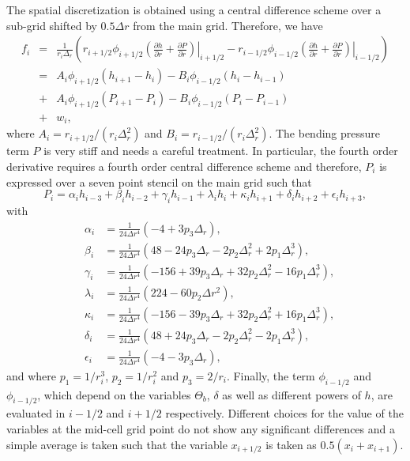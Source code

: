 The  spatial discretization  is  obtained using  a central  difference
scheme  over  a  sub-grid  shifted  by $0.5\Delta  r$  from  the  main
grid. Therefore, we have
\begin{eqnarray}
  f_i&=&\frac{1}{r_i \Delta_r}\left(r_{i+1/2}\phi_{i+1/2}\left.\left(\frac{\partial h}{\partial r}+\frac{\partial P}{\partial r}\right)\right|_{i+1/2}-r_{i-1/2}\phi_{i-1/2}\left.\left(\frac{\partial h}{\partial r}+\frac{\partial P}{\partial r}\right)\right|_{i-1/2}\right)\nonumber\\
     &=&A_i\phi_{i+1/2}\left(h_{i+1}-h_i\right)-B_i\phi_{i-1/2}\left(h_{i}-h_{i-1}\right)\nonumber\\
     &+&A_i\phi_{i+1/2}\left(P_{i+1}-P_i\right)-B_i\phi_{i-1/2}\left(P_{i}-P_{i-1}\right)\nonumber\\
     &+&w_i,\label{C4-Num-3}
\end{eqnarray}
where                $A_i=r_{i+1/2}/(r_i\Delta_r^2)$               and
$B_i=r_{i-1/2}/(r_i\Delta_r^2)$.   The bending  pressure  term $P$  is
very stiff and  needs a careful treatment.  In  particular, the fourth
order derivative requires a fourth order central difference scheme and
therefore, $P_i$ is  expressed over a seven point stencil  on the main
grid such that
\begin{equation}
  P_{i}=   \alpha_{i}h_{i-3}  +   \beta_{i}h_{i-2}+\gamma_{i}  h_{i-1}
  +\lambda_{i}h_{i}+\kappa_{i}h_{i+1}+\delta_ih_{i+2}+\epsilon_ih_{i+3},
  \label{C4-Num-4}
\end{equation}
with
\begin{eqnarray}
  &\alpha_{i}&=\frac{1}{24\Delta r^{4}}\left(-4+3p_3\Delta_r \right)\nonumber ,\\
  &\beta_{i}&=\frac{1}{24\Delta r^{4}}\left(48-24p_3\Delta_r-2p_2\Delta_r^2+2p_1\Delta_r^3\right) \nonumber,\\
  &\gamma_{i}&=\frac{1}{24\Delta r^{4}}\left(-156+39p_3\Delta_r+32p_2\Delta_r^2-16p_1\Delta_r^3\right)\nonumber,\\
  &\lambda_{i}&=\frac{1}{24\Delta r^{4}}\left(224-60p_2\Delta r^{2}\right) \nonumber,\\
  &\kappa_{i}&=\frac{1}{24\Delta r^{4}}\left( -156-39p_3\Delta_r+32p_2\Delta_r^2+16p_1\Delta_r^3\right)\nonumber,\\
  &\delta_{i}&=\frac{1}{24\Delta r^{4}}\left( 48+24p_3\Delta_r-2p_2\Delta_r^2-2p_1\Delta_r^3\right) \nonumber,\\
  &\epsilon_{i}&=\frac{1}{24\Delta r^{4}}\left(-4-3p_3\Delta_r \right),\nonumber
\end{eqnarray}
and where $p_1=1/r_i^3$, $p_2=1/r_i^2$ and $p_3 = 2/r_i$. Finally, the
term $\phi_{i-1/2}$ and $\phi_{i-1/2}$,  which depend on the variables
$\Theta_b$, $\delta$ as well as different powers of $h$, are evaluated
in $i-1/2$ and  $i+1/2$ respectively. Different choices  for the value
of  the  variables  at  the  mid-cell  grid  point  do  not  show  any
significant differences  and a simple  average is taken such  that the
variable $x_{i+1/2}$ is taken as $0.5(x_i+x_{i+1})$.

